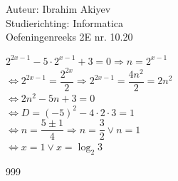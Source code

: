 \documentclass[a4paper]{article}
\begin{document}
\noindent \large Auteur: Ibrahim Akiyev \\
\noindent \large Studierichting: Informatica\\
\noindent \large Oefeningenreeks 2E nr. 10.20\\

\medskip

\normalsize

$2^{2x-1} -5 \cdot 2^{x-1} +3 = 0 \Rightarrow n = 2^{x-1}$\\

$\Leftrightarrow2^{2x-1} = \dfrac{2^{2x}}{2} \Rightarrow 2^{2x-1} = \dfrac{4n^2}{2} = 2n^2$\\

$\Leftrightarrow 2n^2 -5n +3 = 0$\\

$\Leftrightarrow D = (-5)^2 - 4 \cdot 2 \cdot 3 = 1$\\

$\Leftrightarrow n = \dfrac{5 \pm 1}{4} \Rightarrow n = \dfrac{3}{2} \vee n = 1$\\   

$\Leftrightarrow x = 1 \vee x = \log_{2} 3$\\




\begin{thebibliography}{999}
\end{thebibliography}
\end{document}
